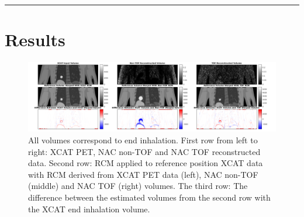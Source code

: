 \documentclass[portrait,color=UCLburgundy,margin=2cm]{uclposter}
\begin{document}
\vspace{-2.0cm}

\rule{1\hsize}{0.1cm}

\vspace{-2.0cm}

\section*{Results}

\begin{figure}[h!]
  \centering
  
  \includegraphics[width=1\linewidth]{output.png}
  
  \begin{highlightbox}[UCLlightblue]
    \captionsetup{singlelinecheck=false, justification=centering}
    \caption{All volumes correspond to end inhalation. First row from left to right: XCAT PET, NAC non-TOF and NAC TOF reconstructed data. Second row: RCM applied to reference position XCAT data with RCM derived from XCAT PET data (left), NAC non-TOF (middle) and NAC TOF (right) volumes. The third row: The difference between the estimated volumes from the second row with the XCAT end inhalation volume.}
  \end{highlightbox}
  
  \label{fig:output}
\end{figure}

\vspace{-0.25cm}
\end{document}
